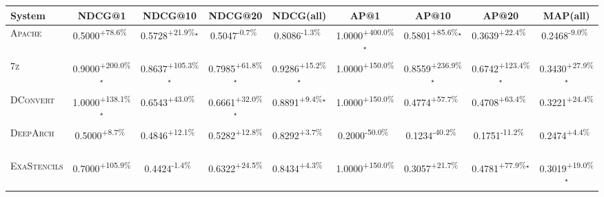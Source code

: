 \begin{table}[htbp]
\centering
\renewcommand{\arraystretch}{1.2}
\begin{tabular}{l|cccc|cccc}
\hline
System & NDCG@1 & NDCG@10 & NDCG@20 & NDCG(all) & AP@1 & AP@10 & AP@20 & MAP(all) \\ \hline
\textsc{Apache} & \cellcolor{green!30}0.5000\textsuperscript{+78.6\%}$^{\,\,\,}$ & \cellcolor{green!30}0.5728\textsuperscript{+21.9\%}$^\star$ & \cellcolor{red!30}0.5047\textsuperscript{-0.7\%}$^{\,\,\,}$ & \cellcolor{red!30}0.8086\textsuperscript{-1.3\%}$^{\,\,\,}$ & \cellcolor{green!30}1.0000\textsuperscript{+400.0\%}$^\star$ & \cellcolor{green!30}0.5801\textsuperscript{+85.6\%}$^\star$ & \cellcolor{green!30}0.3639\textsuperscript{+22.4\%}$^{\,\,\,}$ & \cellcolor{red!30}0.2468\textsuperscript{-9.0\%}$^{\,\,\,}$ \\
\textsc{7z} & \cellcolor{green!30}0.9000\textsuperscript{+200.0\%}$^\star$ & \cellcolor{green!30}0.8637\textsuperscript{+105.3\%}$^\star$ & \cellcolor{green!30}0.7985\textsuperscript{+61.8\%}$^\star$ & \cellcolor{green!30}0.9286\textsuperscript{+15.2\%}$^\star$ & \cellcolor{green!30}1.0000\textsuperscript{+150.0\%}$^{\,\,\,}$ & \cellcolor{green!30}0.8559\textsuperscript{+236.9\%}$^\star$ & \cellcolor{green!30}0.6742\textsuperscript{+123.4\%}$^\star$ & \cellcolor{green!30}0.3430\textsuperscript{+27.9\%}$^\star$ \\
\textsc{DConvert} & \cellcolor{green!30}1.0000\textsuperscript{+138.1\%}$^\star$ & \cellcolor{green!30}0.6543\textsuperscript{+43.0\%}$^{\,\,\,}$ & \cellcolor{green!30}0.6661\textsuperscript{+32.0\%}$^\star$ & \cellcolor{green!30}0.8891\textsuperscript{+9.4\%}$^\star$ & \cellcolor{green!30}1.0000\textsuperscript{+150.0\%}$^{\,\,\,}$ & \cellcolor{green!30}0.4774\textsuperscript{+57.7\%}$^{\,\,\,}$ & \cellcolor{green!30}0.4708\textsuperscript{+63.4\%}$^{\,\,\,}$ & \cellcolor{green!30}0.3221\textsuperscript{+24.4\%}$^{\,\,\,}$ \\
\textsc{DeepArch} & \cellcolor{green!30}0.5000\textsuperscript{+8.7\%}$^{\,\,\,}$ & \cellcolor{green!30}0.4846\textsuperscript{+12.1\%}$^{\,\,\,}$ & \cellcolor{green!30}0.5282\textsuperscript{+12.8\%}$^{\,\,\,}$ & \cellcolor{green!30}0.8292\textsuperscript{+3.7\%}$^{\,\,\,}$ & \cellcolor{red!30}0.2000\textsuperscript{-50.0\%}$^{\,\,\,}$ & \cellcolor{red!30}0.1234\textsuperscript{-40.2\%}$^{\,\,\,}$ & \cellcolor{red!30}0.1751\textsuperscript{-11.2\%}$^{\,\,\,}$ & \cellcolor{green!30}0.2474\textsuperscript{+4.4\%}$^{\,\,\,}$ \\
\textsc{ExaStencils} & \cellcolor{green!30}0.7000\textsuperscript{+105.9\%}$^{\,\,\,}$ & \cellcolor{red!30}0.4424\textsuperscript{-1.4\%}$^{\,\,\,}$ & \cellcolor{green!30}0.6322\textsuperscript{+24.5\%}$^{\,\,\,}$ & \cellcolor{green!30}0.8434\textsuperscript{+4.3\%}$^{\,\,\,}$ & \cellcolor{green!30}1.0000\textsuperscript{+150.0\%}$^{\,\,\,}$ & \cellcolor{green!30}0.3057\textsuperscript{+21.7\%}$^{\,\,\,}$ & \cellcolor{green!30}0.4781\textsuperscript{+77.9\%}$^\star$ & \cellcolor{green!30}0.3019\textsuperscript{+19.0\%}$^\star$ \\

\end{tabular}
\end{table}
